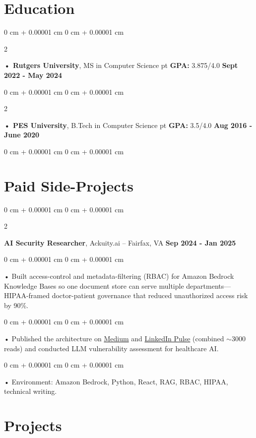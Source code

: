 \documentclass[10pt, letterpaper]{article}
\newenvironment{onecolentry}{
    \begin{adjustwidth}{
        0 cm + 0.00001 cm
    }{
        0 cm + 0.00001 cm
    }
}{
    \end{adjustwidth}
} %
\newenvironment{twocolentry}[2][]{
    \onecolentry
    \def\secondColumn{#2}
    \setcolumnwidth{\fill, 4.5 cm}
    \begin{paracol}{2}
}{
    \switchcolumn \raggedleft \secondColumn
    \end{paracol}
    \endonecolentry
} %
\begin{document}
        \section{Education}
        \vspace{2 pt }
        \begin{twocolentry}{
            \textbf{Sept 2022 - May 2024}
        }
            \textbf{ • Rutgers University}, MS in Computer Science  pt \textbf{GPA:} 3.875/4.0  \end{twocolentry}

        \begin{twocolentry}{
            \textbf{Aug 2016 - June 2020}
        }
            \textbf{ • PES University}, B.Tech in Computer Science  pt \textbf{GPA:} 3.5/4.0  \end{twocolentry}
        \begin{onecolentry}

                        \vspace{0.4cm}
    \section{Paid Side-Projects}
            \vspace{2 pt }
                    \begin{twocolentry}{
            \textbf{Sep 2024 - Jan 2025}
        }
            \textbf{AI Security Researcher}, Ackuity.ai -- Fairfax, VA\end{twocolentry}

        \begin{onecolentry}
             • Built access-control and metadata-filtering (RBAC) for Amazon Bedrock Knowledge Bases so one document store can serve multiple departments---HIPAA-framed doctor-patient governance that reduced unauthorized access risk by 90\%.
        \end{onecolentry}
        \begin{onecolentry}
             • Published the architecture on \href{https://medium.com/@sreenikethaathreya/building-a-permission-aware-genai-application-on-amazon-bedrock-8fdc2410dd43}{Medium} and \href{https://www.linkedin.com/pulse/building-permission-aware-genai-application-amazon-bedrock-aathreya-g7nme/}{LinkedIn Pulse} (combined {$\sim$}3000 reads) and conducted LLM vulnerability assessment for healthcare AI.
        \end{onecolentry}
        \begin{onecolentry}
             • Environment: Amazon Bedrock, Python, React, RAG, RBAC, HIPAA, technical writing.

        \end{onecolentry}

        \vspace{0.4cm}
\section{Projects}
    \vspace{2 pt}
\end{onecolentry}
\end{document}
